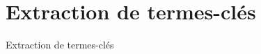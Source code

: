 \section{Extraction de termes-clés}
  \begin{frame}[allowframebreaks]{Extraction de termes-clés}
    \framesubtitle{}
  \end{frame}

